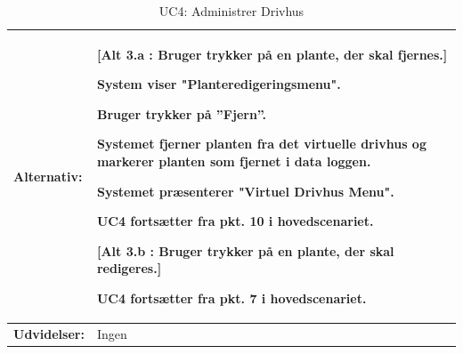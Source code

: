 \begin{table}[h]
\begin{tabularx}{\textwidth}{| >{\raggedright\arraybackslash}p{3.3 cm} | >{\raggedright\arraybackslash}X |}
\textbf{Alternativ:}				& 
\textbf{{[}Alt 3.a : Bruger trykker på en plante, der skal fjernes.{]}}
\begin{packed_enum}
\setcounter{enumi}{3}
\item System viser "Planteredigeringsmenu".
\item Bruger trykker på ”Fjern”.
\item Systemet fjerner planten fra det virtuelle drivhus og markerer planten som fjernet i data loggen.
\item Systemet præsenterer "Virtuel Drivhus Menu".
\item UC4 fortsætter fra pkt. 10 i hovedscenariet.
\end{packed_enum}
\textbf{{[}Alt 3.b : Bruger trykker på en plante, der skal redigeres.{]}}
\begin{packed_enum}
\setcounter{enumi}{3}
\item UC4 fortsætter fra pkt. 7 i hovedscenariet.
\end{packed_enum}
\\ \hline

\textbf{Udvidelser:}				&  
Ingen
\\ \hline
\end{tabularx}
\caption{UC4: Administrer Drivhus}
\label{tbl:UC4}
\end{table}

\clearpage

